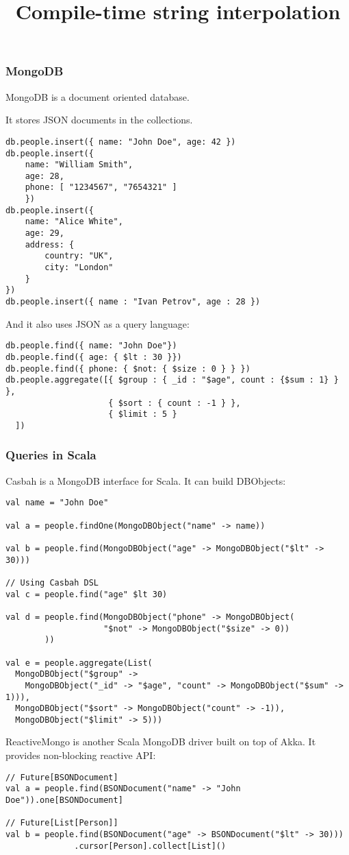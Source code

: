 

\title{Compile-time string interpolation}



\begin{frame}
    \titlepage
\end{frame}

\begin{frame}[fragile]
\frametitle{MongoDB}
MongoDB is a document oriented database.

It stores JSON documents in the collections.
\begin{lstlisting}
db.people.insert({ name: "John Doe", age: 42 })
db.people.insert({ 
    name: "William Smith",
    age: 28,
    phone: [ "1234567", "7654321" ]
    })
db.people.insert({
    name: "Alice White",
    age: 29,
    address: {
        country: "UK",
        city: "London"
    }
})
db.people.insert({ name : "Ivan Petrov", age : 28 })
\end{lstlisting}

And it also uses JSON as a query language:
\begin{lstlisting}
db.people.find({ name: "John Doe"})
db.people.find({ age: { $lt : 30 }})
db.people.find({ phone: { $not: { $size : 0 } } })
db.people.aggregate([{ $group : { _id : "$age", count : {$sum : 1} } },
                     { $sort : { count : -1 } },
                     { $limit : 5 }
  ])
\end{lstlisting}
\end{frame}

\begin{frame}[fragile]
\frametitle{Queries in Scala}
Casbah is a MongoDB interface for Scala.  It can build DBObjects:

\begin{lstlisting}
val name = "John Doe"

val a = people.findOne(MongoDBObject("name" -> name))

val b = people.find(MongoDBObject("age" -> MongoDBObject("$lt" -> 30)))

// Using Casbah DSL
val c = people.find("age" $lt 30)

val d = people.find(MongoDBObject("phone" -> MongoDBObject(
                    "$not" -> MongoDBObject("$size" -> 0))
        ))

val e = people.aggregate(List(
  MongoDBObject("$group" ->
    MongoDBObject("_id" -> "$age", "count" -> MongoDBObject("$sum" -> 1))),
  MongoDBObject("$sort" -> MongoDBObject("count" -> -1)),
  MongoDBObject("$limit" -> 5)))
\end{lstlisting}

ReactiveMongo is another Scala MongoDB driver built on top of Akka.  It provides
non-blocking reactive API:

\begin{lstlisting}
// Future[BSONDocument]
val a = people.find(BSONDocument("name" -> "John Doe")).one[BSONDocument]

// Future[List[Person]]
val b = people.find(BSONDocument("age" -> BSONDocument("$lt" -> 30)))
              .cursor[Person].collect[List]()
\end{lstlisting}
\end{frame}

